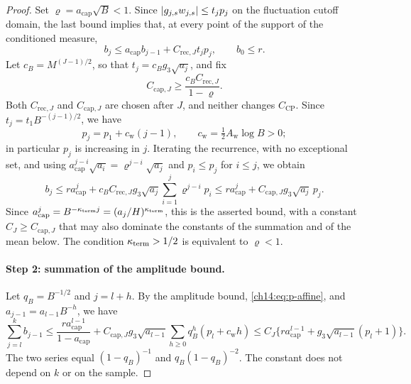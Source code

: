\begin{proof}
Set $\varrho=a_{\mathrm{cap}}\sqrt B<1$. Since $\lvert g_{j,s}w_{j,s}\rvert\le t_jp_j$ on the fluctuation cutoff domain, the last bound implies that, at every point of the support of the conditioned measure,
\[
 b_j\le a_{\mathrm{cap}}b_{j-1}+C_{\mathrm{rec},J}t_jp_j,\qquad b_0\le r.
\]
Let $c_B=M^{(J-1)/2}$, so that $t_j=c_Bg_3\sqrt{a_j}$, and fix
\begin{equation}\label{ch14:eq:cap-constants}
 C_{\mathrm{cap},J}\ge\frac{c_BC_{\mathrm{rec},J}}{1-\varrho}.
\end{equation}
Both $C_{\mathrm{rec},J}$ and $C_{\mathrm{cap},J}$ are chosen after $J$, and neither changes $C_{\mathrm{CP}}$. Since $t_j=t_1B^{-(j-1)/2}$, we have
\begin{equation}\label{ch14:eq:p-affine}
 p_j=p_1+c_{\mathrm w}(j-1),\qquad c_{\mathrm w}=\tfrac12A_{\mathrm w}\log B>0;
\end{equation}
in particular $p_j$ is increasing in $j$. Iterating the recurrence, with no exceptional set, and using $a_{\mathrm{cap}}^{j-i}\sqrt{a_i}=\varrho^{j-i}\sqrt{a_j}$ and $p_i\le p_j$ for $i\le j$, we obtain
\[
 b_j\le ra_{\mathrm{cap}}^j+c_BC_{\mathrm{rec},J}g_3\sqrt{a_j}\sum_{i=1}^j\varrho^{j-i}p_i
 \le ra_{\mathrm{cap}}^j+C_{\mathrm{cap},J}g_3\sqrt{a_j}\,p_j.
\]
Since $a_{\mathrm{cap}}^j=B^{-\kappa_{\mathrm{term}} j}=(a_j/H)^{\kappa_{\mathrm{term}}}$, this is the asserted bound, with a constant $C_J\ge C_{\mathrm{cap},J}$ that may also dominate the constants of the summation and of the mean below. The condition $\kappa_{\mathrm{term}}>1/2$ is equivalent to $\varrho<1$.

\paragraph{Step 2: summation of the amplitude bound.}
Let $q_B=B^{-1/2}$ and $j=l+h$. By the amplitude bound, \eqref{ch14:eq:p-affine}, and $a_{j-1}=a_{l-1}B^{-h}$, we have
\[
 \sum_{j=l}^kb_{j-1}
 \le\frac{ra_{\mathrm{cap}}^{l-1}}{1-a_{\mathrm{cap}}}+C_{\mathrm{cap},J}g_3\sqrt{a_{l-1}}\sum_{h\ge0}q_B^h(p_l+c_{\mathrm w}h)
 \le C_J\bigl\{ra_{\mathrm{cap}}^{l-1}+g_3\sqrt{a_{l-1}}(p_l+1)\bigr\}.
\]
The two series equal $(1-q_B)^{-1}$ and $q_B(1-q_B)^{-2}$. The constant does not depend on $k$ or on the sample.


\end{proof}
